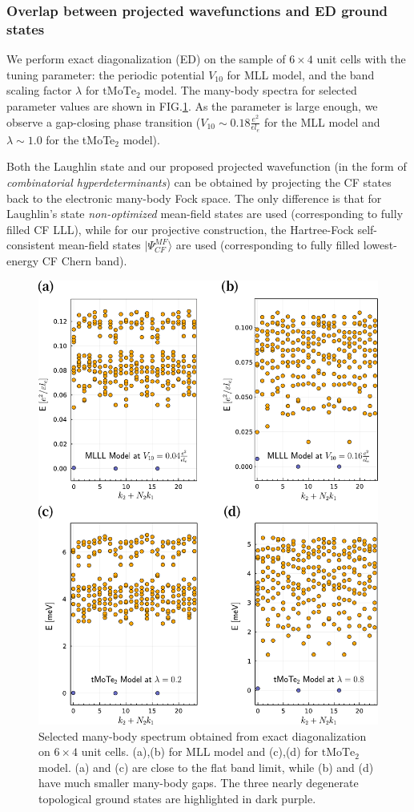 \subsubsection{Overlap between projected wavefunctions and ED ground states}
We perform exact diagonalization (ED) on the sample of $6\times4$ unit cells with the tuning parameter: the periodic potential $V_{10}$ for MLL model, and the band scaling factor $\lambda$ for $\mathrm{tMoTe_2}$ model. The many-body spectra for selected parameter values are shown in FIG.\ref{fig: ED}. As the parameter is large enough, we observe a gap-closing phase transition ($V_{10}\sim 0.18\frac{e^2}{\epsilon l_e}$ for the MLL model and $\lambda\sim 1.0$ for the tMoTe$_2$ model).

Both the Laughlin state and our proposed projected wavefunction (in the form of \emph{combinatorial hyperdeterminants}) can be obtained by projecting the CF states back to the electronic many-body Fock space. The only difference is that for Laughlin's state \emph{non-optimized} mean-field states are used (corresponding to fully filled CF LLL), while for our projective construction, the Hartree-Fock self-consistent mean-field states $|\Psi^{MF}_{CF}\rangle$ are used (corresponding to fully filled lowest-energy CF Chern band).
\begin{figure}
    \centering
    \includegraphics[width=0.9\linewidth]{figures/FCI/combined_ED.pdf}
    \caption{Selected many-body spectrum obtained from exact diagonalization on $6\times4$ unit cells. (a),(b) for MLL model and (c),(d) for $\mathrm{tMoTe_2}$ model. (a) and (c) are close to the flat band limit, while (b) and (d) have much smaller many-body gaps. The three nearly degenerate topological ground states are highlighted in dark purple.}
    \label{fig: ED}
\end{figure}



